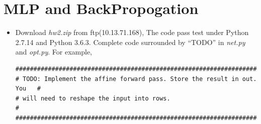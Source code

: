 \documentclass[12pt]{article}
\begin{document}

\section{MLP and BackPropogation} \label{sec:3}

\begin{itemize}

	\item Download \textit{hw2.zip} from ftp(10.13.71.168), The code pass test under Python 2.7.14 and Python 3.6.3. Complete code surrounded by ``TODO'' in \textit{net.py} and \textit{opt.py}. For example,
	      \begin{verbatim}
###########################################################################
# TODO: Implement the affine forward pass. Store the result in out. You   #
# will need to reshape the input into rows.                               #
###########################################################################



\end{verbatim}
\end{itemize}
\end{document}
